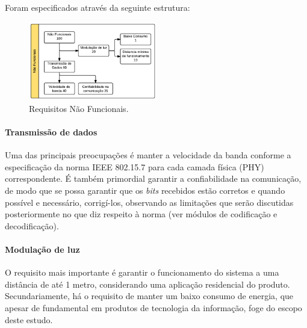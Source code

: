 	Foram especificados através da seguinte estrutura:

	\begin{figure}[h!]
		\caption{\label{fig_req2}Requisitos Não Funcionais.}
		\centering
		\includegraphics[width=0.5\textwidth]{Req_Tree_NFunc.pdf}
	\end{figure}

	\paragraph*{Transmissão de dados}
	Uma das principais preocupações é manter a velocidade da banda conforme a especificação da norma IEEE 802.15.7 para cada camada física (PHY) correspondente. É também primordial garantir a confiabilidade na comunicação, de modo que se possa garantir que os \textit{bits} recebidos estão corretos e quando possível e necessário, corrigí-los, observando as limitações que serão discutidas posteriormente no que diz respeito à norma (ver módulos de codificação e decodificação).

	\paragraph*{Modulação de luz}
	O requisito mais importante é garantir o funcionamento do sistema a uma distância de até 1 metro, considerando uma aplicação residencial do produto. Secundariamente, há o requisito de manter um baixo consumo de energia, que apesar de fundamental em produtos de tecnologia da informação, foge do escopo deste estudo.

